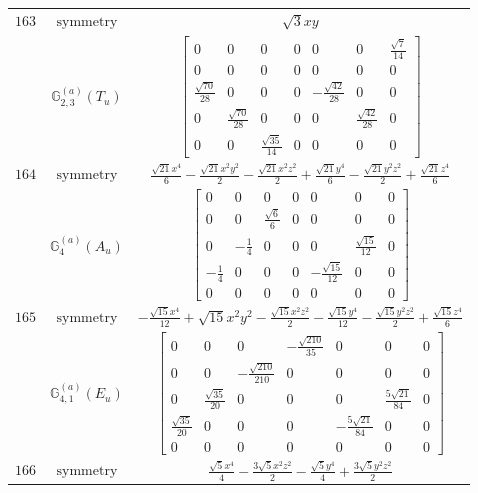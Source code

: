 \documentclass[fleqn,8pt,landscape]{jsarticle}
\begin{document}
\begin{longtable}{ccc}
$ 163 $ & $ \text{symmetry} $ & $ \sqrt{3} x y $ \\
$  $ & $ \mathbb{G}_{2,3}^{(a)}(T_{u}) $ & $ \begin{bmatrix} 0 & 0 & 0 & 0 & 0 & 0 & \frac{\sqrt{7}}{14} \\ 0 & 0 & 0 & 0 & 0 & 0 & 0 \\ \frac{\sqrt{70}}{28} & 0 & 0 & 0 & - \frac{\sqrt{42}}{28} & 0 & 0 \\ 0 & \frac{\sqrt{70}}{28} & 0 & 0 & 0 & \frac{\sqrt{42}}{28} & 0 \\ 0 & 0 & \frac{\sqrt{35}}{14} & 0 & 0 & 0 & 0 \end{bmatrix} $ \\ \hline
$ 164 $ & $ \text{symmetry} $ & $ \frac{\sqrt{21} x^{4}}{6} - \frac{\sqrt{21} x^{2} y^{2}}{2} - \frac{\sqrt{21} x^{2} z^{2}}{2} + \frac{\sqrt{21} y^{4}}{6} - \frac{\sqrt{21} y^{2} z^{2}}{2} + \frac{\sqrt{21} z^{4}}{6} $ \\
$  $ & $ \mathbb{G}_{4}^{(a)}(A_{u}) $ & $ \begin{bmatrix} 0 & 0 & 0 & 0 & 0 & 0 & 0 \\ 0 & 0 & \frac{\sqrt{6}}{6} & 0 & 0 & 0 & 0 \\ 0 & - \frac{1}{4} & 0 & 0 & 0 & \frac{\sqrt{15}}{12} & 0 \\ - \frac{1}{4} & 0 & 0 & 0 & - \frac{\sqrt{15}}{12} & 0 & 0 \\ 0 & 0 & 0 & 0 & 0 & 0 & 0 \end{bmatrix} $ \\ \hline
$ 165 $ & $ \text{symmetry} $ & $ - \frac{\sqrt{15} x^{4}}{12} + \sqrt{15} x^{2} y^{2} - \frac{\sqrt{15} x^{2} z^{2}}{2} - \frac{\sqrt{15} y^{4}}{12} - \frac{\sqrt{15} y^{2} z^{2}}{2} + \frac{\sqrt{15} z^{4}}{6} $ \\
$  $ & $ \mathbb{G}_{4,1}^{(a)}(E_{u}) $ & $ \begin{bmatrix} 0 & 0 & 0 & - \frac{\sqrt{210}}{35} & 0 & 0 & 0 \\ 0 & 0 & - \frac{\sqrt{210}}{210} & 0 & 0 & 0 & 0 \\ 0 & \frac{\sqrt{35}}{20} & 0 & 0 & 0 & \frac{5 \sqrt{21}}{84} & 0 \\ \frac{\sqrt{35}}{20} & 0 & 0 & 0 & - \frac{5 \sqrt{21}}{84} & 0 & 0 \\ 0 & 0 & 0 & 0 & 0 & 0 & 0 \end{bmatrix} $ \\ \hline
$ 166 $ & $ \text{symmetry} $ & $ \frac{\sqrt{5} x^{4}}{4} - \frac{3 \sqrt{5} x^{2} z^{2}}{2} - \frac{\sqrt{5} y^{4}}{4} + \frac{3 \sqrt{5} y^{2} z^{2}}{2} $ \\

\end{longtable}
\end{document}
